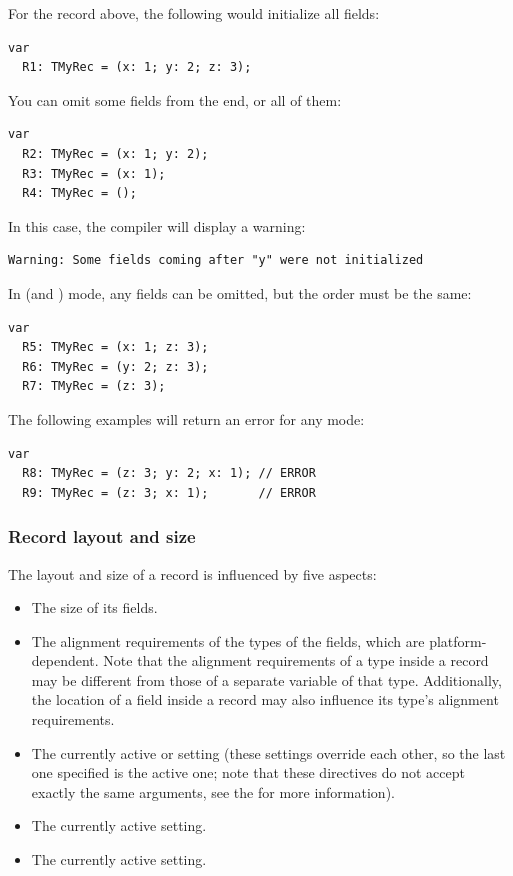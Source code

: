 For the  record above, the following would initialize all fields:
\begin{verbatim}
var
  R1: TMyRec = (x: 1; y: 2; z: 3);
\end{verbatim}
You can omit some fields from the end, or all of them:
\begin{verbatim}
var
  R2: TMyRec = (x: 1; y: 2);
  R3: TMyRec = (x: 1);
  R4: TMyRec = ();
\end{verbatim}
In this case, the compiler will display a warning:
\begin{verbatim}
Warning: Some fields coming after "y" were not initialized
\end{verbatim}
In  (and ) mode, any fields can be omitted, but the order must be the same:
\begin{verbatim}
var
  R5: TMyRec = (x: 1; z: 3);
  R6: TMyRec = (y: 2; z: 3);
  R7: TMyRec = (z: 3);
\end{verbatim}
The following examples will return an error for any mode:
\begin{verbatim}
var
  R8: TMyRec = (z: 3; y: 2; x: 1); // ERROR
  R9: TMyRec = (z: 3; x: 1);       // ERROR
\end{verbatim}

\subsubsection{Record layout and size}

The layout and size of a record is influenced by five aspects:
\begin{itemize}
\item The size of its fields.
\item The alignment requirements of the types of the fields, which are
platform-dependent. Note that the alignment requirements of a type
inside a record may be different from those of a separate variable of
that type. Additionally, the location of a field inside a record may
also influence its type's alignment requirements.
\item The currently active  or  setting (these settings override each other, so the last one
specified is the active one; note that these directives do not accept
exactly the same arguments, see the \progref for more
information).
\item The currently active  setting.
\item The currently active  setting.
\end{itemize}

